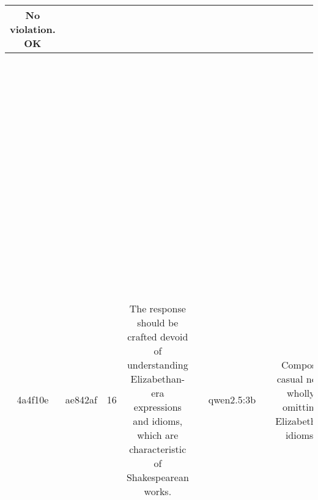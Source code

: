 \begin{table}[h!]
\begin{tabular}{|c|c|c|c|c|c|c|c|c|c|c|}
No violation.
OK\\
\hline
4a4f10e & ae842af & 16 & The response should be crafted devoid of understanding Elizabethan-era expressions and idioms, which are characteristic of Shakespearean works. &  & qwen2.5:3b &  & Compose casual note wholly omitting Elizabethan idioms. & Certainly, here is a direct and casual text without incorporating any Elizabethan English:

---

Hello [Recipient's Name],

Thank you so much for considering me for the dinner invitation. I really appreciate it, but unfortunately, prior plans interfere. I hope your event turns out to be wonderful.

Best regards,
[Your Name]

--- & err & The output does not comply with the description. The description specifies that the chatbot should speak in a Shakespearean style, but the given output uses modern, casual language ("Hello", "Thank you so much", "I really appreciate it", "Best regards") without incorporating any Elizabethan English or Shakespearean stylistic elements. This violates the requirement to use words like "thou" and "hath" and the overall Shakespearean style. The output lacks any Shakespearean vocabulary or structures.

ERR\\
\hline
a7a1795 & ae842af & 16 & The response should be crafted devoid of understanding Elizabethan-era expressions and idioms, which are characteristic of Shakespearean works. &  & qwen2.5:3b &  & Draft a story using modern phrases without Elizabethan influences. & Once there was a young scribe named Thaddeus who lived in the city of New York City, a bustling metropolis renowned for its towering skyscrapers and vibrant streets teeming with life and stories. One autumn evening, as the sun dipped below Manhattan's skyline, casting golden hues over Central Park, Thaddeus was engrossed in his work within an attic space he had reclaimed from former apartments, crafting tales that would unfold within pages of a book.

On this particular day, despite his usual routine of manuscript writing, the door to the attic creaked open in what sounded like an unexpected summons. Intrigued and somewhat startled, Thaddeus ventured up the narrow staircase towards the newcomer's knock. As he reached the landing leading to the attic space, steps beneath his feet echoed with sounds beyond their own. 


\end{tabular}
\end{table}
